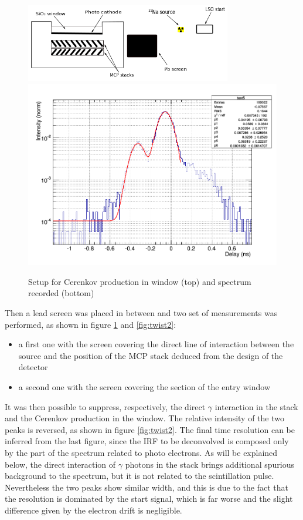\begin{figure}[htbp]
\begin{center}
\includegraphics[width=9cm]{../Pictures/Chapter_8/screen_irf.png}
\includegraphics[width=12cm]{../Pictures/Chapter_8/turn_2.png}
\end{center}
\caption[Setup for Cerenkov production in the window]{Setup for Cerenkov production in window (top) and spectrum recorded (bottom)}
\label{fig:twist1}
\end{figure}
Then a lead screen was placed in between and two set of measurements was performed, as shown in figure \ref{fig:twist1} and \ref{fig:twist2}:
\begin{itemize}
\item a first one with the screen covering the direct line of interaction between the source and the position of the MCP stack deduced from the design of the detector
\item a second one with the screen covering the section of the entry window
\end{itemize}
It was then possible to suppress, respectively, the direct $\gamma$ interaction in the stack and the Cerenkov production in the window. The relative intensity of the two peaks is reversed, as shown in figure \ref{fig:twist2}. 
The final time resolution can be inferred from the 
last figure, since the IRF to be deconvolved is composed only by the part of the spectrum related to photo electrons. As will be explained below, the direct interaction of $\gamma$ photons in the stack brings additional spurious background to the spectrum, but it is not related to the scintillation pulse. Nevertheless the two peaks show similar width, and this is due to the fact that the resolution is dominated by the start signal, which is far worse and the slight difference given by the electron drift is negligible.
